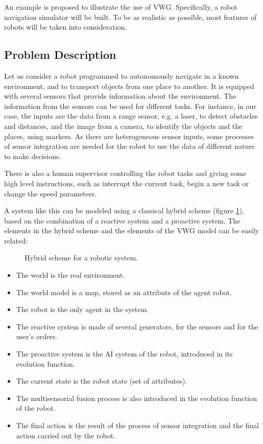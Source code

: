 \documentclass{aamas2012}
\begin{document}
An example is proposed to illustrate the use of VWG. Specifically, a robot navigation simulator will be built.  To be as realistic as possible, most features of robots will be taken into consideration.
\subsection{Problem Description
\label{sec:description_problem}}

Let us consider a robot programmed to autonomously navigate in a known environment, and to transport objects from one place to another. It is equipped with several sensors that provide information about the environment. The information from the sensors can be used for different tasks. For instance, in our case, the inputs are the data from a range sensor, e.g. a laser, to detect obstacles and distances, and the image from a camera, to identify the objects and the places, using markers. As there are heterogeneous sensor inputs, some processes of sensor integration are needed for the robot to use the data of different nature to make decisions.

There is also a human supervisor controlling the robot tasks and giving some high level instructions, such as interrupt the current task, begin a new task or change the speed parameters.

A system like this can be modeled using a classical hybrid scheme (figure \ref{fig:hybrid}), based on the combination of a reactive system and a proactive system. The elements in the hybrid scheme and the elements of the VWG model can be easily related:

\begin{figure}
\centering
{}
\caption{\label{fig:hybrid} Hybrid scheme for a robotic system.}
\end{figure}

\begin{itemize}
\item The world is the real environment.
\item The world model is a map, stored as an attribute of the agent robot.
\item The robot is the only agent in the system.
\item The reactive system is made of several generators, for the sensors and for the user's orders. 
\item The proactive system is the AI system of the robot, introduced in its evolution function.
\item The current state is the robot state (set of attributes).
\item The multisensorial fusion process is also introduced in the evolution function of the robot.
\item The final action is the result of the process of sensor integration and the final action carried out by the robot.
\end{itemize}
\end{document}
